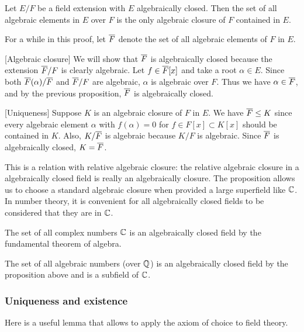 \documentclass{../exp}
\begin{document}
\begin{prop}
Let $E/F$ be a field extension with $E$ algebraically closed.
Then the set of all algebraic elements in $E$ over $F$ is the only algebraic closure of $F$ contained in $E$.
\end{prop}
\begin{pf}
For a while in this proof, let $\overline F$ denote the set of all algebraic elements of $F$ in $E$.

[Algebraic closure]
We will show that $\overline F$ is algebraically closed because the extension $\overline F/F$ is clearly algebraic.
Let $f\in\overline F[x]$ and take a root $\alpha\in E$.
Since both $\overline F(\alpha)/\overline F$ and $\overline F/F$ are algebraic, $\alpha$ is algebraic over $F$.
Thus we have $\alpha\in\overline F$, and by the previous proposition, $\overline F$ is algebraically closed.

[Uniqueness]
Suppose $K$ is an algebraic closure of $F$ in $E$.
We have $\overline F\le K$ since every algebraic element $\alpha$ with $f(\alpha)=0$ for $f\in F[x]\subset K[x]$ should be contained in $K$.
Also, $K/\overline F$ is algebraic because $K/F$ is algebraic.
Since $\overline F$ is algebraically closed, $K=\overline F$.
\end{pf}

This is a relation with relative algebraic closure: the relative algebraic closure in a algebraically closed field is really an algebraically closure.
The proposition allows us to choose a standard algebraic closure when provided a large superfield like $\mathbb{C}$.
In number theory, it is convenient for all algebraically closed fields to be considered that they are in $\mathbb{C}$. 

\begin{exs}
\item
The set of all complex numbers $\mathbb{C}$ is an algebraically closed field by the fundamental theorem of algebra.
\item
The set of all algebraic numbers (over $\mathbb{Q}$) is an algebraically closed field by the proposition above and is a subfield of $\mathbb{C}$.
\end{exs}


\subsubsection{Uniqueness and existence}
Here is a useful lemma that allows to apply the axiom of choice to field theory.
\end{document}

